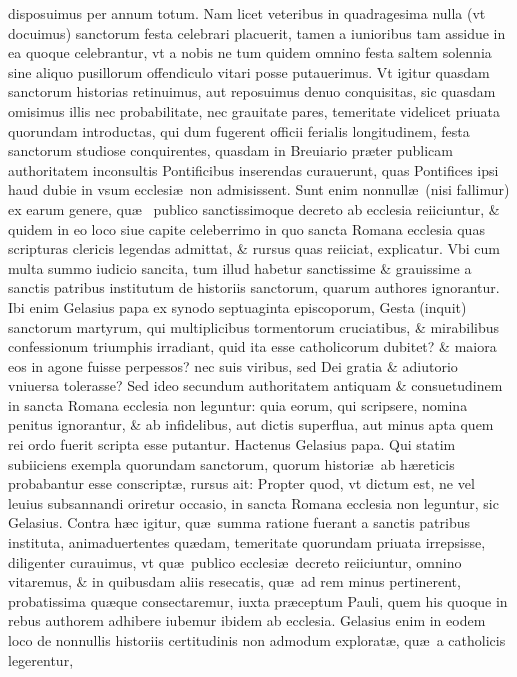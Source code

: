 \documentclass[a5paper,10pt]{book}
\def\ae{æ}
\begin{document}
disposuimus per annum totum.
Nam licet veteribus in quadragesima nulla (vt docuimus) sanctorum %
festa celebrari placuerit, tamen a iunioribus tam assidue in ea quoque celebrantur, vt a nobis ne tum quidem omnino festa saltem solennia sine aliquo pusillorum offendiculo vitari
posse putauerimus.
Vt igitur quasdam sanctorum historias retinuimus, aut reposuimus denuo conquisitas, sic quasdam omisimus illis nec probabilitate, nec grauitate pares, temeritate videlicet priuata quorundam introductas, qui dum fugerent officii ferialis longitudinem, festa sanctorum %
studiose conquirentes, quasdam in Breuiario pr\ae ter publicam authoritatem inconsultis Pontificibus inserendas curauerunt, quas Pontifices ipsi haud dubie in vsum ecclesi\ae \ non admisissent.
Sunt enim nonnull\ae \ (nisi fallimur) ex earum genere, qu\ae \ %
publico sanctissimoque decreto ab ecclesia reiiciuntur, \& quidem in eo loco siue capite celeberrimo in quo sancta Romana ecclesia quas scripturas clericis legendas admittat, \& rursus quas reiiciat, explicatur.
Vbi cum multa summo iudicio sancita, tum illud habetur sanctissime \& grauissime a sanctis patribus institutum de historiis sanctorum, %
quarum authores ignorantur.
Ibi enim Gelasius papa ex synodo septuaginta episcoporum, Gesta (inquit) sanctorum %
martyrum, qui multiplicibus tormentorum cruciatibus, \& mirabilibus confessionum triumphis irradiant, quid ita esse catholicorum dubitet?
\& maiora eos in agone fuisse perpessos?
nec suis viribus, sed Dei gratia \& adiutorio vniuersa tolerasse?
Sed ideo secundum authoritatem antiquam \& consuetudinem in sancta Romana ecclesia non leguntur:
quia eorum, qui scripsere, nomina penitus ignorantur, \& ab infidelibus, aut dictis superflua, aut minus apta quem %
rei ordo fuerit scripta esse putantur.
Hactenus Gelasius papa.
Qui statim subiiciens exempla quorundam sanctorum, %
quorum histori\ae \ ab h\ae reticis probabantur esse conscript\ae , rursus ait:
Propter quod, vt dictum est, ne vel leuius subsannandi oriretur occasio, in sancta Romana ecclesia non leguntur, sic Gelasius.
Contra h\ae c igitur, qu\ae \ summa ratione fuerant a sanctis patribus instituta, animaduertentes qu\ae dam, temeritate quorundam priuata irrepsisse, diligenter curauimus, vt qu\ae \ publico ecclesi\ae \ decreto reiiciuntur, omnino vitaremus, \& in quibusdam aliis resecatis, qu\ae \ ad rem minus pertinerent, probatissima qu\ae que consectaremur, iuxta pr\ae ceptum Pauli, quem his quoque in rebus authorem adhibere iubemur ibidem ab ecclesia.
Gelasius enim in eodem loco de nonnullis historiis certitudinis non admodum explorat\ae , qu\ae \ a catholicis legerentur,
\end{document}
